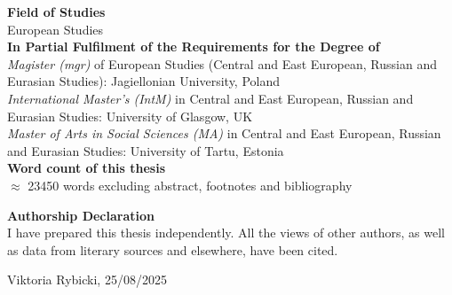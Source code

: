 {\bfseries{Field of Studies}} \\
European Studies \\

\noindent
{\bfseries{In Partial Fulfilment of the Requirements for the Degree of}} \\
\noindent
{\textit{Magister (mgr)}} of European Studies (Central and East European, Russian and Eurasian Studies):
Jagiellonian University, Poland \\

\noindent
{\textit{International Master’s (IntM)}} in Central and East European, Russian and Eurasian Studies:
University of Glasgow, UK  \\

\noindent
{\textit{Master of Arts in Social Sciences (MA)}} in Central and East European, Russian and Eurasian Studies: University of Tartu, Estonia \\

\noindent
{\bfseries{Word count of this thesis}} \\
\noindent
$\approx$ 23450 words excluding abstract, footnotes and bibliography \\

\vspace{2cm}

\noindent
{\bfseries{Authorship Declaration}} \\
\noindent
I have prepared this thesis independently. All the views of other authors, as well as data from literary sources and elsewhere, have been cited. \\

\vspace{1cm}

\noindent
Viktoria Rybicki, 25/08/2025 \\